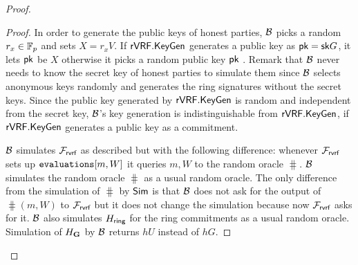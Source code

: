 \begin{proof}
\begin{proof}
			In order to generate the public keys of honest parties, $ \mathcal{B} $ picks a random $ r_x\in \mathbb{F}_p $ and sets $ X =r_xV$. If $ {\mathsf{rVRF}}.{\mathsf{KeyGen}} $  generates a public key as $ \mathsf{pk} = \mathsf{sk} G $, it lets $ \mathsf{pk} $ be $ X $ otherwise it picks a random public key $ \mathsf{pk} $ .
			Remark that $ \mathcal{B}$  never needs to know the secret key of honest parties to simulate them since $ \mathcal{B} $ selects anonymous keys randomly  and generates the ring signatures  without the secret keys. Since the public key generated by $ {\mathsf{rVRF}}.{\mathsf{KeyGen}} $ is random and independent from the secret key, $ \mathcal{B} $'s key generation is indistinguishable from $ {\mathsf{rVRF}}.{\mathsf{KeyGen}} $, if ${\mathsf{rVRF}}.{\mathsf{KeyGen}} $  generates a public key as a commitment.
			
				
			$ \mathcal{B} $ simulates $ \mathcal{F}_{\textsf{rvrf}} $ as described but with the following difference: whenever $ \mathcal{F}_{\textsf{rvrf}} $ sets up $ \texttt{evaluations}[m,W] $ it queries $ m,W $ to the random oracle $ \hash $. $ \mathcal{B} $ simulates the random oracle $ \hash $  as a usual random oracle.
			The only difference from the simulation of $ \hash $ by $ \mathsf{Sim} $ is that $ \mathcal{B} $ does not ask for the output of $ \hash(m,W) $ to $ \mathcal{F}_{\textsf{rvrf}} $ but it does not change the simulation because now $\mathcal{F}_{\textsf{rvrf}} $ asks for it.  
			$ \mathcal{B} $ also simulates $ H_\mathsf{ring} $ for the ring commitments as a usual random oracle. 			
			Simulation of $ H_{\mathbf{G}} $ by $ \mathcal{B} $ returns $ hU $ instead of $ hG $. 
%			
%				
%						
%						
%						
%						
%						
%						
			
%				
%						
%						
%						
%						
%						
%						
%						
%						
%						


\end{proof}
\end{proof}
